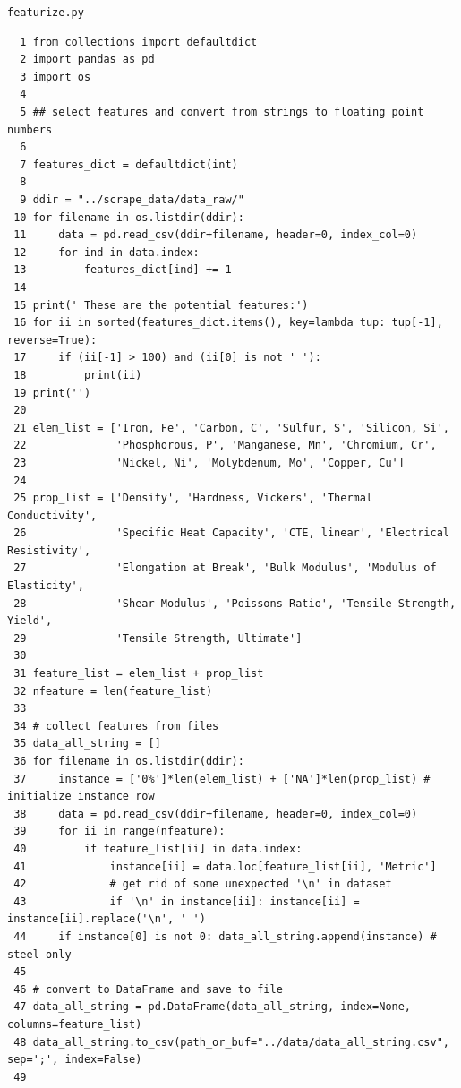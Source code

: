 \documentclass[10pt,aps,prb,amsmath,amssymb,twocolumn,letterpaper,nobalancelastpage,final,citeautoscript,floatfix,raggedbottom,superscriptaddress]{revtex4-1}
\begin{document}
\clearpage
\noindent \hypertarget{featurize}{\texttt{\Large{featurize.py}}}
\begin{lstlisting}
  1 from collections import defaultdict
  2 import pandas as pd
  3 import os
  4 
  5 ## select features and convert from strings to floating point numbers
  6 
  7 features_dict = defaultdict(int)
  8 
  9 ddir = "../scrape_data/data_raw/"
 10 for filename in os.listdir(ddir):
 11     data = pd.read_csv(ddir+filename, header=0, index_col=0)
 12     for ind in data.index:
 13         features_dict[ind] += 1
 14 
 15 print(' These are the potential features:')
 16 for ii in sorted(features_dict.items(), key=lambda tup: tup[-1], reverse=True):
 17     if (ii[-1] > 100) and (ii[0] is not ' '):
 18         print(ii)
 19 print('')
 20 
 21 elem_list = ['Iron, Fe', 'Carbon, C', 'Sulfur, S', 'Silicon, Si', 
 22              'Phosphorous, P', 'Manganese, Mn', 'Chromium, Cr', 
 23              'Nickel, Ni', 'Molybdenum, Mo', 'Copper, Cu']
 24 
 25 prop_list = ['Density', 'Hardness, Vickers', 'Thermal Conductivity',
 26              'Specific Heat Capacity', 'CTE, linear', 'Electrical Resistivity',
 27              'Elongation at Break', 'Bulk Modulus', 'Modulus of Elasticity',
 28              'Shear Modulus', 'Poissons Ratio', 'Tensile Strength, Yield',
 29              'Tensile Strength, Ultimate']
 30 
 31 feature_list = elem_list + prop_list
 32 nfeature = len(feature_list)
 33 
 34 # collect features from files
 35 data_all_string = []
 36 for filename in os.listdir(ddir):
 37     instance = ['0%']*len(elem_list) + ['NA']*len(prop_list) # initialize instance row
 38     data = pd.read_csv(ddir+filename, header=0, index_col=0)
 39     for ii in range(nfeature): 
 40         if feature_list[ii] in data.index:
 41             instance[ii] = data.loc[feature_list[ii], 'Metric']
 42             # get rid of some unexpected '\n' in dataset
 43             if '\n' in instance[ii]: instance[ii] = instance[ii].replace('\n', ' ')
 44     if instance[0] is not 0: data_all_string.append(instance) # steel only
 45 
 46 # convert to DataFrame and save to file
 47 data_all_string = pd.DataFrame(data_all_string, index=None, columns=feature_list)
 48 data_all_string.to_csv(path_or_buf="../data/data_all_string.csv", sep=';', index=False)
 49 
\end{lstlisting}
\clearpage
\end{document}
